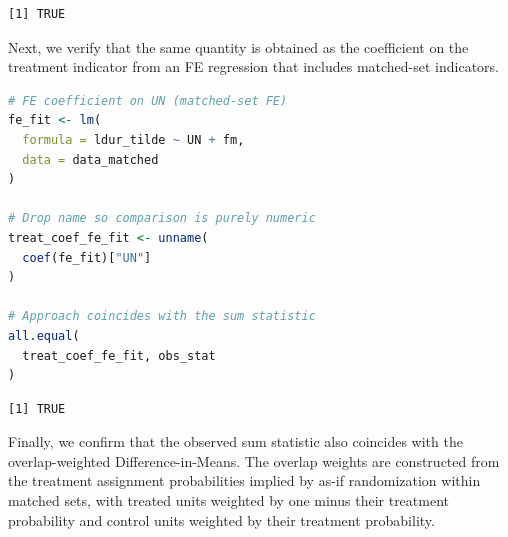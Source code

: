 \documentclass[twoside,11pt]{article}
\begin{document}
\begin{verbatim}
[1] TRUE
\end{verbatim}



Next, we verify that the same quantity is obtained as the coefficient on
the treatment indicator from an FE regression that includes
matched-set indicators.



\begin{lstlisting}[language=R]
# FE coefficient on UN (matched-set FE)
fe_fit <- lm(
  formula = ldur_tilde ~ UN + fm,
  data = data_matched
)

# Drop name so comparison is purely numeric
treat_coef_fe_fit <- unname(
  coef(fe_fit)["UN"]
)

# Approach coincides with the sum statistic
all.equal(
  treat_coef_fe_fit, obs_stat
)
\end{lstlisting}

\begin{verbatim}
[1] TRUE
\end{verbatim}



Finally, we confirm that the observed sum statistic also coincides with
the overlap-weighted Difference-in-Means. The overlap weights are
constructed from the treatment assignment probabilities implied by as-if
randomization within matched sets, with treated units weighted by one
minus their treatment probability and control units weighted by their
treatment probability.
\end{document}
